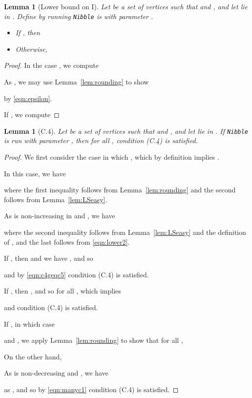 \documentclass[11pt]{article}
\newtheorem{lemma}[theorem]{Lemma}
\begin{document}
\begin{lemma}[Lower bound on I]\label{lem:lowerBound}
Let  be a set of vertices
  such that
   and
  , and
  let  lie in .
Define  by running 
 \texttt{Nibble} is with parameter .
\begin{itemize}
\item [1.] If , then

\item [2.] Otherwise,

\end{itemize}
\end{lemma}
\begin{proof}
In the case , we compute

As , we may use
 Lemma~\ref{lem:rounding} 
  to show

by  \eqref{eqn:epsilon}.

If , we compute

\end{proof}


\begin{lemma}[C.4]\label{lem:C4}
Let  be a set of vertices
  such that
   and
  , and
  let  lie in .
If \texttt{Nibble} is run with parameter ,
  then for all ,
  condition (C.4) is satisfied.
\end{lemma}
\begin{proof}
We first consider the case in which ,
  which by definition implies .

In this case,
  we have

where the first inequality follows from Lemma~\ref{lem:rounding}
and the second follows from Lemma~\ref{lem:LSeasy}.

As  is non-increasing in 
  and , we have

where the second inequality follows from Lemma~\ref{lem:LSeasy} and the definition
  of , and the last follows from \eqref{eqn:lower2}.

If , then  
  and we have ,
 and so

and by \eqref{eqn:c4geqc5} condition (C.4) is satisfied.

If , then , and so 
   for all ,
  which implies

and condition (C.4) is satisfied.

If , in which case
  
  and ,
  we apply Lemma~\ref{lem:rounding}  to show that
  for all ,

On the other hand,

As  is non-decreasing and ,
  we have

as ,
and so by \eqref{eqn:manyc1} condition (C.4) is satisfied.
\end{proof}
\end{document}
